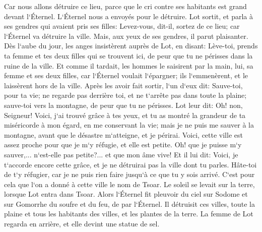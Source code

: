 \verse Car nous allons détruire ce lieu, parce que le cri contre ses habitants est grand devant l`Éternel. L`Éternel nous a envoyés pour le détruire. 
\verse Lot sortit, et parla à ses gendres qui avaient pris ses filles: Levez-vous, dit-il, sortez de ce lieu; car l`Éternel va détruire la ville. Mais, aux yeux de ses gendres, il parut plaisanter. 
\verse Dès l`aube du jour, les anges insistèrent auprès de Lot, en disant: Lève-toi, prends ta femme et tes deux filles qui se trouvent ici, de peur que tu ne périsses dans la ruine de la ville. 
\verse Et comme il tardait, les hommes le saisirent par la main, lui, sa femme et ses deux filles, car l`Éternel voulait l`épargner; ils l`emmenèrent, et le laissèrent hors de la ville. 
\verse Après les avoir fait sortir, l`un d`eux dit: Sauve-toi, pour ta vie; ne regarde pas derrière toi, et ne t`arrête pas dans toute la plaine; sauve-toi vers la montagne, de peur que tu ne périsses. 
\verse Lot leur dit: Oh! non, Seigneur! 
\verse Voici, j`ai trouvé grâce à tes yeux, et tu as montré la grandeur de ta miséricorde à mon égard, en me conservant la vie; mais je ne puis me sauver à la montagne, avant que le désastre m`atteigne, et je périrai. 
\verse Voici, cette ville est assez proche pour que je m`y réfugie, et elle est petite. Oh! que je puisse m`y sauver,... n`est-elle pas petite?... et que mon âme vive! 
\verse Et il lui dit: Voici, je t`accorde encore cette grâce, et je ne détruirai pas la ville dont tu parles. 
\verse Hâte-toi de t`y réfugier, car je ne puis rien faire jusqu`à ce que tu y sois arrivé. C`est pour cela que l`on a donné à cette ville le nom de Tsoar. 
\verse Le soleil se levait sur la terre, lorsque Lot entra dans Tsoar. 
\verse Alors l`Éternel fit pleuvoir du ciel sur Sodome et sur Gomorrhe du soufre et du feu, de par l`Éternel. 
\verse Il détruisit ces villes, toute la plaine et tous les habitants des villes, et les plantes de la terre. 
\verse La femme de Lot regarda en arrière, et elle devint une statue de sel. 
